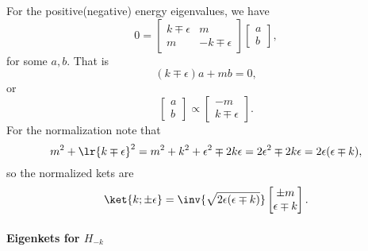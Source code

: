For the positive(negative) energy eigenvalues, we have
%
\begin{dmath}\label{eqn:gradQuantumProblemSet4Problem3:140}
0
=
\begin{bmatrix}
k \mp \epsilon & m \\
m & -k \mp \epsilon
\end{bmatrix}
\begin{bmatrix}
a \\
b
\end{bmatrix},
\end{dmath}
%
for some \( a, b\).  That is
%
\begin{dmath}\label{eqn:gradQuantumProblemSet4Problem3:160}
(k \mp \epsilon) a + m b = 0,
\end{dmath}
%
or
%
\begin{dmath}\label{eqn:gradQuantumProblemSet4Problem3:180}
\begin{bmatrix}
a \\
b
\end{bmatrix}
\propto
\begin{bmatrix}
- m \\
k \mp \epsilon
\end{bmatrix}.
\end{dmath}
%
For the normalization note that
%
\begin{dmath}\label{eqn:gradQuantumProblemSet4Problem3:200}
m^2 + \lr{ k \mp \epsilon }^2
=
m^2 + k^2 + \epsilon^2 \mp 2 k \epsilon
=
2 \epsilon^2 \mp 2 k \epsilon
=
2 \epsilon (\epsilon \mp k),
\end{dmath}
%
so the normalized kets are
%
\begin{dmath}\label{eqn:gradQuantumProblemSet4Problem3:220}
\ket{k; \pm\epsilon} =
\inv{\sqrt{2 \epsilon(\epsilon \mp k)}}
\begin{bmatrix}
\pm m \\
\epsilon \mp k
\end{bmatrix}.
\end{dmath}
%
\paragraph{Eigenkets for \( H_{-k} \)}

